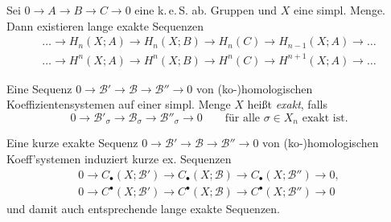 \documentclass{cheat-sheet}
\newcommand{\CC}[1]{{#1}_{\bullet}} %
\newcommand{\CCC}[1]{{#1}^{\bullet}} %
\newcommand{\keS}{k.\,e.\,S.} %
\begin{document}
\begin{kor}
  Sei $0 \to A \to B \to C \to 0$ eine \keS{} ab. Gruppen und $X$ eine simpl. Menge. Dann existieren lange exakte Sequenzen
  \begin{align*}
    \ldots \to H_n(X; A) \to H_n(X; B) \to H_n(C) \to H_{n-1}(X; A) \to \ldots \\
    \ldots \to H^n(X; A) \to H^n(X; B) \to H^n(C) \to H^{n+1}(X; A) \to \ldots
  \end{align*}
\end{kor}



\begin{defn}
  Eine Sequenz $0 \to \mathcal{B}' \to \mathcal{B} \to \mathcal{B}'' \to 0$ von (ko-)homologischen Koeffizientensystemen auf einer simpl. Menge $X$ heißt \emph{exakt}, falls
  \[
    0 \to \mathcal{B}'_\sigma \to \mathcal{B}_\sigma \to \mathcal{B}''_\sigma \to 0 \qquad
    \text{für alle $\sigma \in X_n$ exakt ist.}
  \]
\end{defn}

\begin{lem}
  Eine kurze exakte Sequenz $0 \to \mathcal{B}' \to \mathcal{B} \to \mathcal{B}'' \to 0$ von (ko-)homologischen Koeff'systemen induziert kurze ex. Sequenzen
  \begin{align*}
    0 \to \CC{C}(X; \mathcal{B}') \to \CC{C}(X; \mathcal{B}) \to \CC{C}(X; \mathcal{B}'') \to 0, \\
    0 \to \CCC{C}(X; \mathcal{B}') \to \CCC{C}(X; \mathcal{B}) \to \CCC{C}(X; \mathcal{B}'') \to 0
  \end{align*}
  und damit auch entsprechende lange exakte Sequenzen.
\end{lem}

\end{document}
